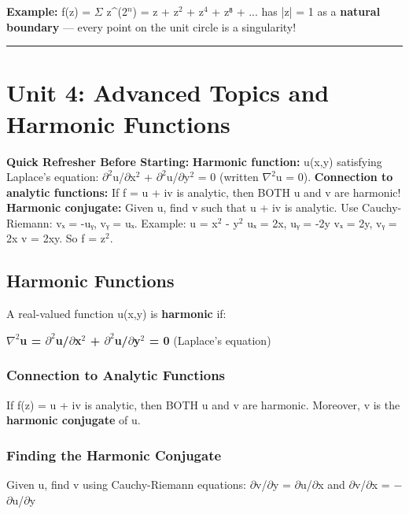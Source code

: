 \documentclass[12pt,a4paper,openany]{book}
\begin{document}
{{\begin{tcolorbox}[colback=examplebg!30,colframe=exampleborder,title=\textbf{Worked Example},breakable,boxrule=1pt]
\textbf{Example:} f(z) = $\Sigma$ z^(2$^n$) = z + z$^2$ + z$^4$ + z⁸ + ... has |z| = 1 as a \textbf{natural boundary} — every point on the unit circle is a singularity!
\end{tcolorbox}

\bigskip\noindent\rule{\textwidth}{0.4pt}\bigskip

\section{Unit 4: Advanced Topics and Harmonic Functions}

\begin{prereqbox}
 \textbf{Quick Refresher Before Starting:}
\textbf{Harmonic function:} u(x,y) satisfying Laplace's equation: $\partial^2$u/$\partial$x$^2$ + $\partial^2$u/$\partial$y$^2$ = 0 (written $\nabla^2$u = 0).
\textbf{Connection to analytic functions:} If f = u + iv is analytic, then BOTH u and v are harmonic!
\textbf{Harmonic conjugate:} Given u, find v such that u + iv is analytic. Use Cauchy-Riemann: vₓ = -uᵧ, vᵧ = uₓ.
Example: u = x$^2$ - y$^2$  uₓ = 2x, uᵧ = -2y  vₓ = 2y, vᵧ = 2x  v = 2xy. So f = z$^2$.
\end{prereqbox}


\subsection{Harmonic Functions}

A real-valued function u(x,y) is \textbf{harmonic} if:

\textbf{$\nabla^2$u = $\partial^2$u/$\partial$x$^2$ + $\partial^2$u/$\partial$y$^2$ = 0} (Laplace's equation)

\subsubsection{Connection to Analytic Functions }
If f(z) = u + iv is analytic, then BOTH u and v are harmonic. Moreover, v is the \textbf{harmonic conjugate} of u.

\subsubsection{Finding the Harmonic Conjugate}
Given u, find v using Cauchy-Riemann equations:
$\partial$v/$\partial$y = $\partial$u/$\partial$x and $\partial$v/$\partial$x = −$\partial$u/$\partial$y

}}
\end{document}
